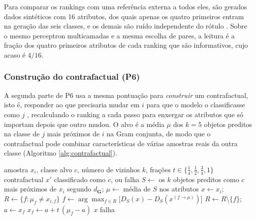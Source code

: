 Para comparar os rankings com uma referência externa a todos eles, são gerados dados sintéticos com 16 atributos, dos quais apenas os quatro primeiros entram na geração das seis classes, e os demais são ruído independente do rótulo \citep{Guyon2003}. Sobre o mesmo perceptron multicamadas e a mesma escolha de pares, a leitura é a fração dos quatro primeiros atributos de cada ranking que são informativos, cujo acaso é $4/16$.

\subsubsection*{Construção do contrafactual (P6)}

A segunda parte de P6 usa a mesma pontuação para \emph{construir} um contrafactual, isto é, responder ao que precisaria mudar em $i$ para que o modelo o classificasse como $j$ \citep{Wachter2018, Guidotti2022}, recalculando o ranking a cada passo para enxergar os atributos que só importam depois que outro mudou. O alvo é a média $\mu$ dos $k = 5$ objetos preditos na classe de $j$ mais próximos de $i$ na Gram conjunta, de modo que o contrafactual pode combinar características de várias amostras reais da outra classe (Algoritmo \ref{alg:contrafactual}).

\begin{algorithm}[htbp]
\caption{Contrafactual sequencial guiado pela geometria}
\label{alg:contrafactual}
\begin{algorithmic}[1]
\Require amostra $x_i$, classe alvo $c$, número de vizinhos $k$, frações $t \in \{\tfrac14, \tfrac12, \tfrac34, 1\}$
\Ensure contrafactual $x'$ classificado como $c$, ou falha
\State $S \gets$ os $k$ objetos preditos como $c$ mais próximos de $x_i$ segundo $d_{\mathbf{G}}$; \quad $\mu \gets$ média de $S$ nos atributos
\State $x \gets x_i$; \quad $R \gets \{f : \mu_f \neq x_{i,f}\}$
    \State $f \gets \arg\max_{f \in R} \bigl[D_S(x) - D_S(x^{(f \to \mu)})\bigr]$ 
    \State $R \gets R \setminus \{f\}$; \quad $a \gets x_f$
        \State $x_f \gets a + t\,(\mu_f - a)$
         \Return $x$ \EndIf
    \EndFor
\EndWhile
\State \Return falha
\end{algorithmic}
\end{algorithm}

